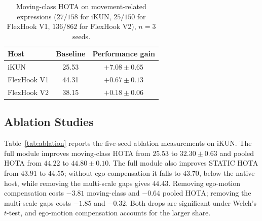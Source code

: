 \documentclass{article}
\begin{document}


\begin{table}
  \centering
  \caption{Moving-class HOTA on movement-related expressions ($27/158$ for iKUN, $25/150$ for FlexHook V1, $136/862$ for FlexHook V2), $n{=}3$ seeds.}
  \label{tab:deficit}
  \small
  \setlength{\tabcolsep}{2pt}
  \begin{tabular}{lcc}
    \hline
    Host        & Baseline & Performance gain \\
    \hline
    iKUN        & 25.53    & $+7.08\pm0.65$   \\
    FlexHook V1 & 44.31    & $+0.67\pm0.13$   \\
    FlexHook V2 & 38.15    & $+0.18\pm0.06$   \\
    \hline
  \end{tabular}
\end{table}

\subsection{Ablation Studies}
\label{sec:ablation}
Table~\ref{tab:ablation} reports the five-seed ablation measurements on iKUN. The full module improves moving-class HOTA from $25.53$ to $32.30\pm0.63$ and pooled HOTA from $44.22$ to $44.80\pm0.10$. The full module also improves STATIC HOTA from $43.91$ to $44.55$; without ego compensation it falls to $43.70$, below the native host, while removing the multi-scale gaps gives $44.43$. Removing ego-motion compensation costs $-3.81$ moving-class and $-0.64$ pooled HOTA; removing the multi-scale gaps costs $-1.85$ and $-0.32$. Both drops are significant under Welch's $t$-test, and ego-motion compensation accounts for the larger share.
\end{document}
